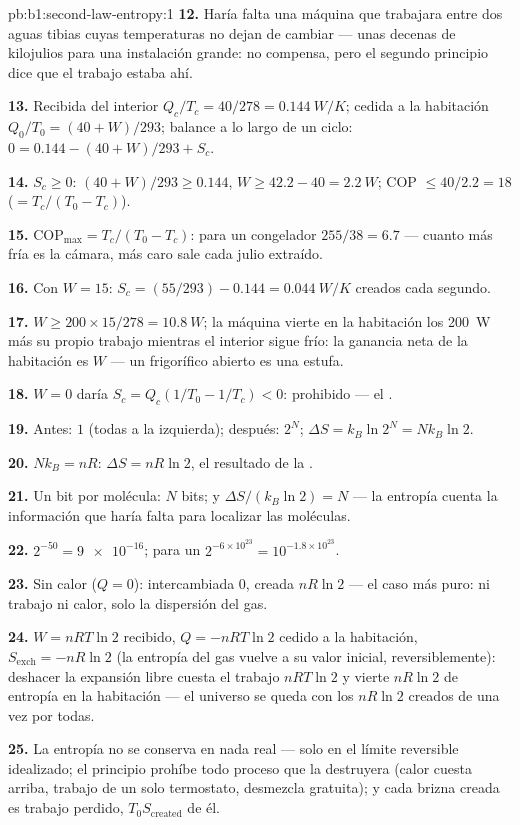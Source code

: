 \begin{solution}{pb:b1:second-law-entropy:1}
\textbf{12.} Haría falta una máquina que trabajara entre dos aguas tibias
cuyas temperaturas no dejan de cambiar --- unas decenas de kilojulios para
una instalación grande: no compensa, pero el segundo principio dice que el
trabajo estaba ahí.

\textbf{13.} Recibida del interior $Q_c/T_c = 40/278 = \qty{0.144}{W/K}$;
cedida a la habitación $Q_0/T_0 = (40 + W)/293$; balance a lo largo de un ciclo:
$0 = 0.144 - (40 + W)/293 + S_c$.

\textbf{14.} $S_c \geq 0$: $(40 + W)/293 \geq 0.144$, $W \geq 42.2 - 40 =
\qty{2.2}{W}$; COP $\leq 40/2.2 = 18$ ($= T_c/(T_0 - T_c)$).

\textbf{15.} $\mathrm{COP}_{\max} = T_c/(T_0 - T_c)$: para un congelador $255/38 = 6.7$
--- cuanto más fría es la cámara, más caro sale cada julio extraído.

\textbf{16.} Con $W = 15$: $S_c = (55/293) - 0.144 = \qty{0.044}{W/K}$ creados
cada segundo.

\textbf{17.} $W \geq 200 \times 15/278 = \qty{10.8}{W}$; la máquina vierte en la
habitación los \qty{200}{W} más su propio trabajo mientras el interior sigue
frío: la ganancia neta de la habitación es $W$ --- un frigorífico abierto es una estufa.

\textbf{18.} $W = 0$ daría $S_c = Q_c(1/T_0 - 1/T_c) < 0$: prohibido --- el
.

\textbf{19.} Antes: $1$ (todas a la izquierda); después: $2^N$; $\Delta S = k_B\ln2^N =
Nk_B\ln2$.

\textbf{20.} $Nk_B = nR$: $\Delta S = nR\ln2$, el resultado de la .

\textbf{21.} Un bit por molécula: $N$ bits; y $\Delta S/(k_B\ln2) = N$ --- la
entropía cuenta la información que haría falta para localizar las
moléculas.

\textbf{22.} $2^{-50} = \num{9e-16}$; para un  $2^{-6\times10^{23}} =
10^{-1.8\times10^{23}}$.

\textbf{23.} Sin calor ($Q = 0$): intercambiada $0$, creada $nR\ln2$ --- el
caso más puro: ni trabajo ni calor, solo la dispersión del gas.

\textbf{24.} $W = nRT\ln2$ recibido, $Q = -nRT\ln2$ cedido a la habitación,
$S_{\mathrm{exch}} = -nR\ln2$ (la entropía del gas vuelve a su valor
inicial, reversiblemente): deshacer la expansión libre cuesta el trabajo
$nRT\ln2$ y vierte $nR\ln2$ de entropía en la habitación --- el universo se
queda con los $nR\ln2$ creados de una vez por todas.

\textbf{25.} La entropía no se conserva en nada real --- solo en el límite
reversible idealizado; el principio prohíbe todo proceso que la destruyera
(calor cuesta arriba, trabajo de un solo termostato, desmezcla gratuita);
y cada brizna creada es trabajo perdido, $T_0S_{\mathrm{created}}$ de él.
\end{solution}
